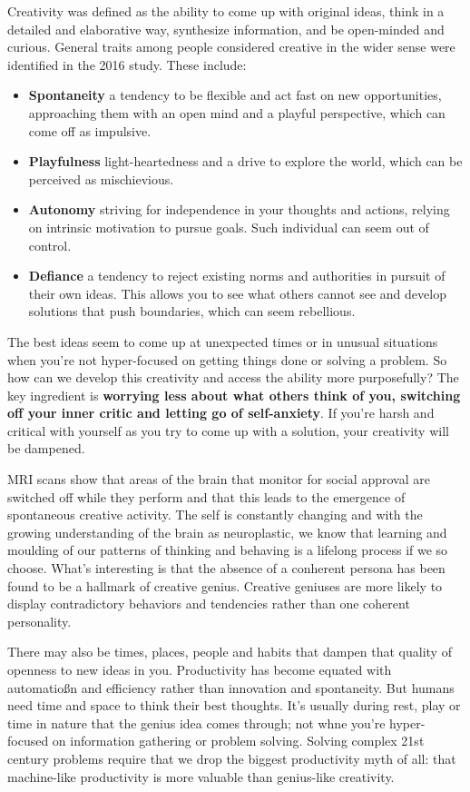\documentclass[ebook,12pt,oneside,openany]{memoir}
\begin{document}
Creativity was defined as the ability to come up with original ideas, think in a detailed and elaborative way, synthesize information, and be open-minded and curious.
General traits among people considered creative in the wider sense were identified in the 2016 study. These include:
\begin{itemize}
    \item \textbf{Spontaneity} a tendency to be flexible and act fast on new opportunities, approaching them with an open mind and a playful perspective, which can come off as impulsive.
    \item \textbf{Playfulness} light-heartedness and a drive to explore the world, which can be perceived as mischievious.
    \item \textbf{Autonomy} striving for independence in your thoughts and actions, relying on intrinsic motivation to pursue goals. Such individual can seem out of control.
    \item \textbf{Defiance} a tendency to reject existing norms and authorities in pursuit of their own ideas. This allows you to see what others cannot see and develop solutions that push boundaries, which can seem rebellious.
\end{itemize}

The best ideas seem to come up at unexpected times or in unusual situations when you're not hyper-focused on getting things done or solving a problem.
So how can we develop this creativity and access the ability more purposefully? The key ingredient is \textbf{worrying less about what others think of you, switching off your inner critic and letting go of self-anxiety}.
If you're harsh and critical with yourself as you try to come up with a solution, your creativity will be dampened. 

MRI scans show that areas of the brain that monitor for social approval are switched off while they perform and that this leads to the emergence of spontaneous creative activity.
The self is constantly changing and with the growing understanding of the brain as neuroplastic, we know that learning and moulding of our patterns of thinking and behaving is a lifelong process if we so choose.
What's interesting is that the absence of a conherent persona has been found to be a hallmark of creative genius. 
Creative geniuses are more likely to display contradictory behaviors and tendencies rather than one coherent personality.

There may also be times, places, people and habits that dampen that quality of openness to new ideas in you.
Productivity has become equated with automatioßn and efficiency rather than innovation and spontaneity.
But humans need time and space to think their best thoughts. It's usually during rest, play or time in nature that the genius idea comes through; not whne you're hyper-focused on information gathering or problem solving.
Solving complex 21st century problems require that we drop the biggest productivity myth of all: that machine-like productivity is more valuable than genius-like creativity.
\end{document}
